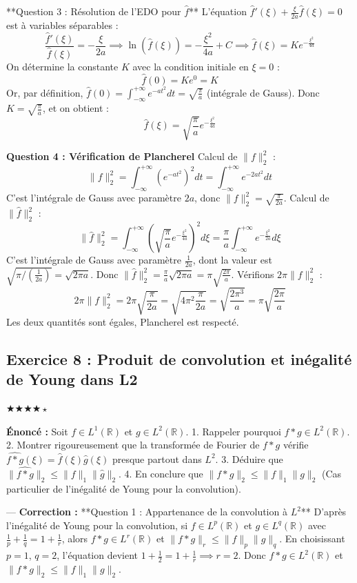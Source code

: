 \documentclass[11pt,a4paper]{article}
\begin{document}
**Question 3 : Résolution de l'EDO pour $\hat{f}$**
L'équation $\hat{f}'(\xi) + \frac{\xi}{2a} \hat{f}(\xi) = 0$ est à variables séparables :
$$ \frac{\hat{f}'(\xi)}{\hat{f}(\xi)} = -\frac{\xi}{2a} \implies \ln(\hat{f}(\xi)) = -\frac{\xi^2}{4a} + C \implies \hat{f}(\xi) = K e^{-\frac{\xi^2}{4a}} $$
On détermine la constante $K$ avec la condition initiale en $\xi = 0$ :
$$ \hat{f}(0) = K e^0 = K $$
Or, par définition, $\hat{f}(0) = \int_{-\infty}^{+\infty} e^{-at^2} dt = \sqrt{\frac{\pi}{a}}$ (intégrale de Gauss).
Donc $K = \sqrt{\frac{\pi}{a}}$, et on obtient :
$$ \hat{f}(\xi) = \sqrt{\frac{\pi}{a}} e^{-\frac{\xi^2}{4a}} $$

\textbf{Question 4 : Vérification de Plancherel}
Calcul de $\|f\|_2^2$ :
$$ \|f\|_2^2 = \int_{-\infty}^{+\infty} (e^{-at^2})^2 dt = \int_{-\infty}^{+\infty} e^{-2at^2} dt $$
C'est l'intégrale de Gauss avec paramètre $2a$, donc $\|f\|_2^2 = \sqrt{\frac{\pi}{2a}}$.
Calcul de $\|\hat{f}\|_2^2$ :
$$ \|\hat{f}\|_2^2 = \int_{-\infty}^{+\infty} \left( \sqrt{\frac{\pi}{a}} e^{-\frac{\xi^2}{4a}} \right)^2 d\xi = \frac{\pi}{a} \int_{-\infty}^{+\infty} e^{-\frac{\xi^2}{2a}} d\xi $$
C'est l'intégrale de Gauss avec paramètre $\frac{1}{2a}$, dont la valeur est $\sqrt{\pi / (\frac{1}{2a})} = \sqrt{2\pi a}$.
Donc $\|\hat{f}\|_2^2 = \frac{\pi}{a} \sqrt{2\pi a} = \pi \sqrt{\frac{2\pi}{a}}$.
Vérifions $2\pi \|f\|_2^2$ :
$$ 2\pi \|f\|_2^2 = 2\pi \sqrt{\frac{\pi}{2a}} = \sqrt{4\pi^2 \frac{\pi}{2a}} = \sqrt{\frac{2\pi^3}{a}} = \pi \sqrt{\frac{2\pi}{a}} $$
Les deux quantités sont égales, Plancherel est respecté.


\subsection*{Exercice 8 : Produit de convolution et inégalité de Young dans L2}
$\bigstar\bigstar\bigstar\bigstar\star$

\textbf{Énoncé :}
Soit $f \in L^1(\mathbb{R})$ et $g \in L^2(\mathbb{R})$.
1. Rappeler pourquoi $f * g \in L^2(\mathbb{R})$.
2. Montrer rigoureusement que la transformée de Fourier de $f * g$ vérifie $\widehat{f * g}(\xi) = \hat{f}(\xi)\hat{g}(\xi)$ presque partout dans $L^2$.
3. Déduire que $\|\widehat{f * g}\|_2 \le \|f\|_1 \|\hat{g}\|_2$.
4. En conclure que $\|f * g\|_2 \le \|f\|_1 \|g\|_2$ (Cas particulier de l'inégalité de Young pour la convolution).

---
\textbf{Correction :}
**Question 1 : Appartenance de la convolution à $L^2$**
D'après l'inégalité de Young pour la convolution, si $f \in L^p(\mathbb{R})$ et $g \in L^q(\mathbb{R})$ avec $\frac{1}{p} + \frac{1}{q} = 1 + \frac{1}{r}$, alors $f * g \in L^r(\mathbb{R})$ et $\|f * g\|_r \le \|f\|_p \|g\|_q$.
En choisissant $p = 1$, $q = 2$, l'équation devient $1 + \frac{1}{2} = 1 + \frac{1}{r} \implies r = 2$.
Donc $f * g \in L^2(\mathbb{R})$ et $\|f * g\|_2 \le \|f\|_1 \|g\|_2$.
\end{document}

